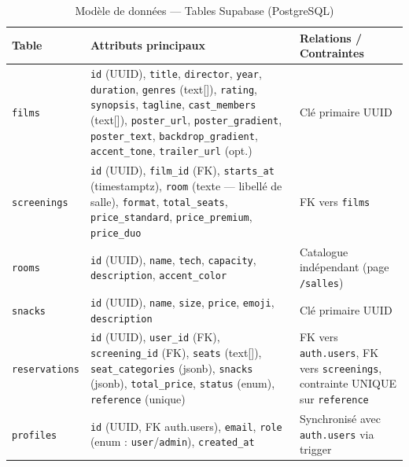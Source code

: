 \documentclass[12pt,a4paper,openany]{report}
\begin{document}
\begin{table}[H]
\centering
\small
\begin{tabularx}{\textwidth}{lXp{4.5cm}}
\toprule
\textbf{Table} & \textbf{Attributs principaux} & \textbf{Relations / Contraintes} \\
\midrule
\texttt{films}       & \texttt{id} (UUID), \texttt{title}, \texttt{director}, \texttt{year}, \texttt{duration}, \texttt{genres} (text[]), \texttt{rating}, \texttt{synopsis}, \texttt{tagline}, \texttt{cast\_members} (text[]), \texttt{poster\_url}, \texttt{poster\_gradient}, \texttt{poster\_text}, \texttt{backdrop\_gradient}, \texttt{accent\_tone}, \texttt{trailer\_url} (opt.) & Clé primaire UUID \\[4pt]

\texttt{screenings}  & \texttt{id} (UUID), \texttt{film\_id} (FK), \texttt{starts\_at} (timestamptz), \texttt{room} (texte — libellé de salle), \texttt{format}, \texttt{total\_seats}, \texttt{price\_standard}, \texttt{price\_premium}, \texttt{price\_duo} & FK vers \texttt{films} \\[4pt]

\texttt{rooms}       & \texttt{id} (UUID), \texttt{name}, \texttt{tech}, \texttt{capacity}, \texttt{description}, \texttt{accent\_color} & Catalogue indépendant (page \texttt{/salles}) \\[4pt]

\texttt{snacks}      & \texttt{id} (UUID), \texttt{name}, \texttt{size}, \texttt{price}, \texttt{emoji}, \texttt{description} & Clé primaire UUID \\[4pt]

\texttt{reservations}& \texttt{id} (UUID), \texttt{user\_id} (FK), \texttt{screening\_id} (FK), \texttt{seats} (text[]), \texttt{seat\_categories} (jsonb), \texttt{snacks} (jsonb), \texttt{total\_price}, \texttt{status} (enum), \texttt{reference} (unique) & FK vers \texttt{auth.users}, FK vers \texttt{screenings}, contrainte UNIQUE sur \texttt{reference} \\[4pt]

\texttt{profiles}    & \texttt{id} (UUID, FK auth.users), \texttt{email}, \texttt{role} (enum : \texttt{user}/\texttt{admin}), \texttt{created\_at} & Synchronisé avec \texttt{auth.users} via trigger \\
\bottomrule
\end{tabularx}
\caption{Modèle de données — Tables Supabase (PostgreSQL)}
\end{table}
\end{document}
